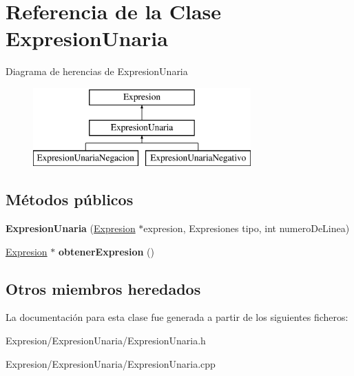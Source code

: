 \hypertarget{class_expresion_unaria}{\section{Referencia de la Clase Expresion\-Unaria}
\label{class_expresion_unaria}
}
Diagrama de herencias de Expresion\-Unaria\begin{figure}[H]
\begin{center}
\leavevmode
\includegraphics[height=3.000000cm]{class_expresion_unaria}
\end{center}
\end{figure}
\subsection*{Métodos públicos}
\begin{DoxyCompactItemize}
\item 
\hypertarget{class_expresion_unaria_a85140ab958ab019f4ee572b48eaacb05}{{\bfseries Expresion\-Unaria} (\hyperlink{class_expresion}{Expresion} $\ast$expresion, Expresiones tipo, int numero\-De\-Linea)}\label{class_expresion_unaria_a85140ab958ab019f4ee572b48eaacb05}

\item 
\hypertarget{class_expresion_unaria_a9d2b8382b86dadef390bc9cbbd480ad1}{\hyperlink{class_expresion}{Expresion} $\ast$ {\bfseries obtener\-Expresion} ()}\label{class_expresion_unaria_a9d2b8382b86dadef390bc9cbbd480ad1}

\end{DoxyCompactItemize}
\subsection*{Otros miembros heredados}


La documentación para esta clase fue generada a partir de los siguientes ficheros\-:\begin{DoxyCompactItemize}
\item 
Expresion/\-Expresion\-Unaria/Expresion\-Unaria.\-h\item 
Expresion/\-Expresion\-Unaria/Expresion\-Unaria.\-cpp\end{DoxyCompactItemize}
